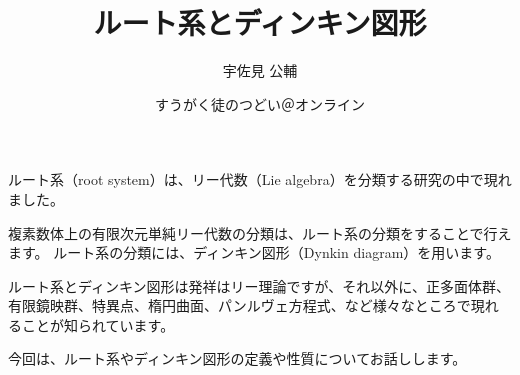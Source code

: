 \documentclass[paper=a5,fontsize=9pt]{jlreq}
\title{ルート系とディンキン図形}
\author{宇佐見 公輔}
\date{すうがく徒のつどい＠オンライン}
\begin{document}
\maketitle

ルート系（root system）は、リー代数（Lie algebra）を分類する研究の中で現れました。

\begin{figure}
    \centering
\end{figure}

複素数体上の有限次元単純リー代数の分類は、ルート系の分類をすることで行えます。
ルート系の分類には、ディンキン図形（Dynkin diagram）を用います。

\begin{figure}
    \centering
\end{figure}

ルート系とディンキン図形は発祥はリー理論ですが、それ以外に、正多面体群、有限鏡映群、特異点、楕円曲面、パンルヴェ方程式、など様々なところで現れることが知られています。

今回は、ルート系やディンキン図形の定義や性質についてお話しします。
\end{document}
